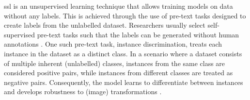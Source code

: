 \acf{ssl} is an unsupervised learning technique that allows training models on data without any labels.
This is achieved through the use of pre-text tasks designed to create labels from the unlabelled dataset.
Researchers usually select self-supervised pre-text tasks such that 
the labels can be generated without human annotations \citet{PIC_2020}.
One such pre-text task, instance discrimination, treats each instance in the dataset as a distinct class.
In a scenario where a dataset consists of multiple inherent (unlabelled) classes, 
instances from the same class are considered positive pairs, 
while instances from different classes are treated as negative pairs.
Consequently, the model learns to differentiate between instances and 
develops robustness to (image) transformations
\citet{PIC_2020,swav_2020,local_aggr_2019,grape_2024,CL_temp_2021}.